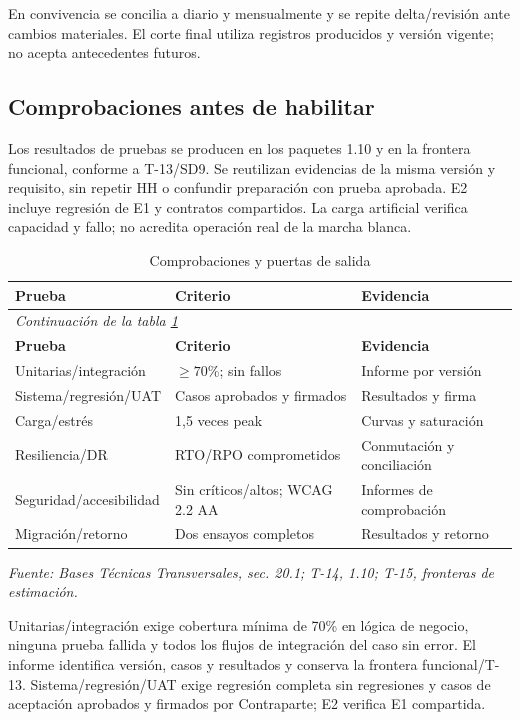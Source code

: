En convivencia se concilia a diario y mensualmente y se repite delta/revisión ante cambios materiales. El corte final utiliza registros producidos y versión vigente; no acepta antecedentes futuros.

\subsection{Comprobaciones antes de habilitar}
Los resultados de pruebas se producen en los paquetes 1.10 y en la frontera funcional, conforme a T-13/SD9. Se reutilizan evidencias de la misma versión y requisito, sin repetir HH o confundir preparación con prueba aprobada. E2 incluye regresión de E1 y contratos compartidos. La carga artificial verifica capacidad y fallo; no acredita operación real de la marcha blanca.

\begingroup\small\setlength{\tabcolsep}{3pt}
\begin{longtable}{p{}p{}p{}}
\caption{Comprobaciones y puertas de salida}\label{tab:t18-pruebas}\\\hline
\textbf{Prueba} & \textbf{Criterio} & \textbf{Evidencia}\\\hline\endfirsthead
\multicolumn{3}{l}{\textit{Continuación de la tabla \ref{tab:t18-pruebas}}}\\\hline
\textbf{Prueba} & \textbf{Criterio} & \textbf{Evidencia}\\\hline\endhead
\hline\endfoot\hline\endlastfoot
Unitarias/integración & $\geq 70\%$; sin fallos & Informe por versión\\\hline
Sistema/regresión/UAT & Casos aprobados y firmados & Resultados y firma\\\hline
Carga/estrés & 1,5 veces peak & Curvas y saturación\\\hline
Resiliencia/DR & RTO/RPO comprometidos & Conmutación y conciliación\\\hline
Seguridad/accesibilidad & Sin críticos/altos; WCAG 2.2 AA & Informes de comprobación\\\hline
Migración/retorno & Dos ensayos completos & Resultados y retorno\\\hline
\end{longtable}\endgroup
\noindent\textit{Fuente: Bases Técnicas Transversales, sec. 20.1; T-14, 1.10; T-15, fronteras de estimación.}

Unitarias/integración exige cobertura mínima de 70\% en lógica de negocio, ninguna prueba fallida y todos los flujos de integración del caso sin error. El informe identifica versión, casos y resultados y conserva la frontera funcional/T-13. Sistema/regresión/UAT exige regresión completa sin regresiones y casos de aceptación aprobados y firmados por Contraparte; E2 verifica E1 compartida.

